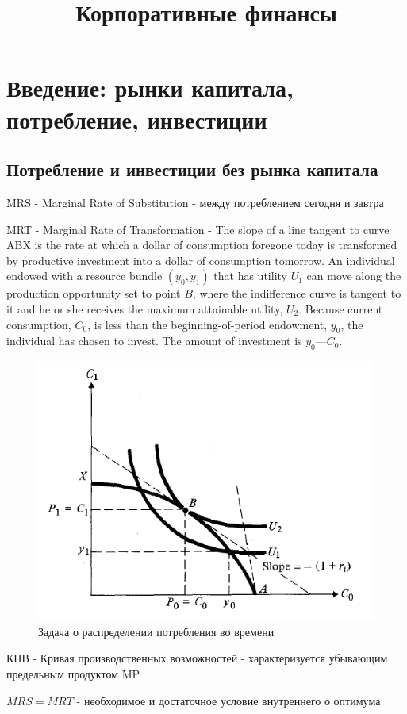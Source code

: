 \documentclass[a4paper,12pt]{article} %
\author{}
\title{Корпоративные финансы}
\date{}
\begin{document}
\maketitle

\section{Введение: рынки капитала, потребление, инвестиции}
	
\subsection{Потребление и инвестиции без рынка капитала}

MRS - Marginal Rate of Substitution - между потреблением сегодня и завтра

MRT - Marginal Rate of Transformation -  The slope of a line tangent to curve
ABX is the rate at which a dollar of consumption foregone today is transformed
by productive investment into a dollar of consumption tomorrow.  An individual endowed with a resource
bundle $ (y_0, y_1) $ that has utility $ U_1 $ can move along the production opportunity set
to point $ B $, where the indifference curve is tangent to it and he or she receives the
maximum attainable utility, $ U_2 $. Because current consumption, $ C_0 $, is less than the
beginning-of-period endowment, $ y_0 $, the individual has chosen to invest. The amount
of investment is $ y_0 — C_0 $. 

\begin{figure}[h!]
	\centering
	\includegraphics[width=0.5\linewidth]{screenshot001}
	\caption{Задача о распределении потребления во времени}
	\label{fig:screenshot001}
\end{figure}

КПВ - Кривая производственных возможностей - характеризуется убывающим предельным продуктом MP

$ MRS = MRT $ - необходимое и достаточное условие внутреннего о оптимума 
\end{document}
